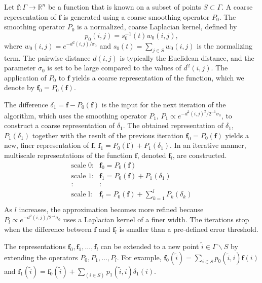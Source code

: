 \documentclass[aip,jcp,preprint]{revtex4-1}
\begin{document}
Let $\mathbf{f}: \Gamma \rightarrow \mathbb{R}^n$ be a function that is known on a subset of points $S \subset \Gamma$.
%
A coarse representation of $\mathbf{f}$ is generated using a coarse smoothing operator $P_0$.
%
The smoothing operator $P_0$ is a normalized, coarse Laplacian kernel, defined by 
\begin{equation}
p_0(i, j)= s_0^{-1}(t)w_0(i, j),
\end{equation}
where $w_0(i, j)=e^{-d^2(i, j) / \sigma_0}$ and $s_0(t)=\sum_{j \in S}w_0(i, j)$ is the normalizing term.
%
The pairwise distance $d(i, j)$ is typically the Euclidean distance, and the parameter $\sigma_0$ is set to be large compared to the values of $d^2(i, j)$.
%
The application of $P_0$ to $\mathbf{f}$ yields a coarse representation of the function, which we denote by $\mathbf{f}_0=P_0(\mathbf{f})$.

The difference $\delta_1 = \mathbf{f}-P_0(\mathbf{f})$ is the input for the next iteration of the algorithm,
which uses the smoothing operator $P_1$, $P_1 \propto e^{-d^2(i, j)^2 / 2^{-1} \sigma_0}$, to construct a coarse representation of $\delta_1$.
%
The obtained representation of $\delta_1$, $P_1(\delta_1)$ together with the result of the previous iteration $\mathbf{f}_0 = P_0(\mathbf{f})$
yields a new, finer representation of $\mathbf{f}$, $\mathbf{f}_1 = P_0(\mathbf{f}) + P_1(\delta_1)$.
%
In an iterative manner, multiscale representations of the function $\mathbf{f}$, denoted $\mathbf{f}_l$, are constructed.
\begin{equation} \label{eq:LP_multi_scale}
 \begin{array}{cl}
\mbox{scale 0:} & \mathbf{f}_0 = P_0(\mathbf{f}) \\
\mbox{scale 1:} & \mathbf{f}_1 = P_0(\mathbf{f}) + P_1(\delta_1) \\
: & : \\
\mbox{scale l:} & \mathbf{f}_l = P_0(\mathbf{f}) + \sum_{k=1}^{l}P_k(\delta_k)\\
\end{array}
\end{equation}
As $l$ increases, the approximation becomes more refined because $P_l \propto e^{-d^2(i, j) / 2^{-l} \sigma_0}$ uses a Laplacian kernel of a finer width.
%
The iterations stop when the difference between $\mathbf{f}$ and $\mathbf{f}_l$ is smaller than a pre-defined error threshold.

The representations $\mathbf{f}_0, \mathbf{f}_1, \dots, \mathbf{f}_l$ can be extended to a new point $\tilde{i} \in \Gamma \backslash S $ by extending the operators $P_0, P_1,\ldots,P_l$.
%
For example, $\mathbf{f}_0(\tilde{i}) = \sum_{i \in S} p_0(\tilde{i}, i)\mathbf{f}(i)$ and
$\mathbf{f}_1(\tilde{i}) = \mathbf{f}_0(\tilde{i}) + \sum_{(i \in S)}p_1(\tilde{i}, i)\delta_1(i)$.
\end{document}
